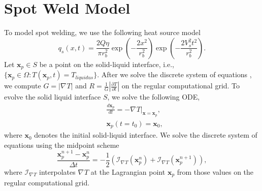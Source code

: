 \documentclass[a4paper,12pt]{article}
\newcommand{\V}[1]{\boldsymbol{#1}}
\newcommand{\B}[1]{\mathbf{#1}}
\newcommand{\grad}[1]{\nabla_{#1}}
\begin{document}
%
%
%
%
%


\section{Spot Weld Model}
To model spot welding, we use the following heat source model
\begin{equation}
q_s(x,t) =  \frac{2Q\eta}{\pi r_b^2} \exp \left( -\frac{ 2x^2}{ r_b^2} \right)   \exp \left( -\frac{ 2V_s^2t^2}{ r_b^2} \right).
\end{equation}
Let $\V{x}_p \in S$ be a point on the solid-liquid interface, i.e., $\{  \V{x}_p \in \Omega : T(\V{x}_p ,t) = T_{liquidus}  \}$.
After we solve the discrete system of equations , we compute $G =  | \grad{} T |$ and $R = \frac{1}{G} | \frac{\partial T}{\partial t} |$ on the regular computational grid. To evolve the solid liquid interface $S$, we solve the following ODE,
\begin{align}
& \frac{d \V{x}_p }{dt} = - \grad{} T \bigg|_{\V{x} = \V{x}_p},  \label{eq:sl_cont } \\
& \V{x}_p (t = t_0) = \V{x}_{0},
\end{align}
where $\V{x}_0$ denotes the initial solid-liquid interface.  We solve the discrete system of equations using the midpoint scheme
\begin{equation}
\frac{\V{x}_p^{n+1} - \V{x}_p^n}{\Delta t} = - \frac{1}{2} (   \mathcal{I}_{ \grad{} T } (\V{x}^{n}_p)  + \mathcal{I}_{ \grad{} T } (\V{x}^{n+1}_p) ) ,
\end{equation}
where $\mathcal{I}_{\grad{} T}$ interpolates $\grad{} T$ at the Lagrangian point $\V{x}_p$ from those values on the regular computational grid. 
\end{document}
